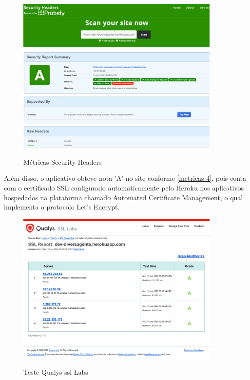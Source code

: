 \begin{figure}[h]
	\centering
	\caption{\label{fig_arq_virado}Métricas Security Headers}
	\includegraphics[width=0.90\textwidth]{anexos/metricas1.png}
	\label{metricas-1}
\end{figure}


Além disso, o aplicativo obteve nota 'A' no site  conforme \autoref{metricas-4}, pois conta com o certificado SSL configurado automaticamente pelo Heroku nos aplicativos hospedados na plataforma chamado Automated Certificate Management, o qual implementa o protocolo Let’s Encrypt.

\begin{figure}[h]
	\centering
	\caption{\label{fig_arq_virado}Teste Qualys \ac{ssl} Labs}
	\includegraphics[width=0.90\textwidth]{anexos/metricas4.png}
	\label{metricas-4}
\end{figure}


